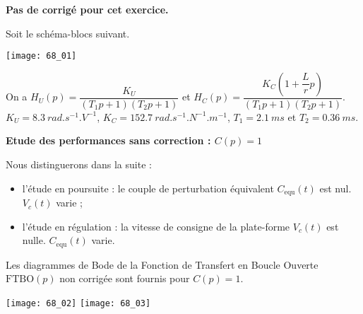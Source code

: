\normaltrue \difficilefalse \tdifficilefalse
\correctionfalse

\setcounter{question}{0}


\ifcorrection
\else
\textbf{Pas de corrigé pour cet exercice.}
\fi

\ifprof
\else

Soit le schéma-blocs suivant. 

\begin{center}
\texttt{[image: 68\_01]}
\end{center}

On a $H_U(p) = \dfrac{K_U}{\left( T_1 p +1 \right)\left( T_2 p +1 \right)}$ et $H_C(p) = \dfrac{K_C \left( 1+\dfrac{L}{r}p\right)}{\left( T_1 p +1 \right)\left( T_2 p +1 \right)}$. $K_U =\SI{8,3}{rad.s^{-1}.V^{-1}}$, $K_C = \SI{152,7}{rad.s^{-1}.N^{-1}.m^{-1}}$, $T_1 = \SI{2,1}{ms}$ et $T_2 = \SI{0,36}{ms}$.

\textbf{Etude des performances sans correction : $C( p) =1$}

Nous distinguerons dans la suite :
\begin{itemize}
\item l’étude en poursuite : le couple de perturbation équivalent $C_{\text{equ}} (t)$ est nul. $V_c(t)$ varie ;
\item l’étude en régulation : la vitesse de consigne de la plate-forme $V_c(t)$  est nulle. $C_{\text{equ}} (t)$ varie.
\end{itemize}

Les diagrammes de Bode de la Fonction de Transfert en Boucle Ouverte $\text{FTBO}( p)$ non corrigée sont fournis pour $C( p) = 1$.

\begin{center}
\texttt{[image: 68\_02]}
\texttt{[image: 68\_03]}
\end{center}
\fi

\ifprof
\else 
\fi

\ifprof
\else 
\fi


